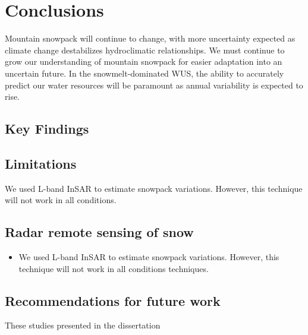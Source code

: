 
\hypertarget{ch5}{\chapter{Conclusions}\label{ch5}}

Mountain snowpack will continue to change, with more uncertainty expected as climate change destabilizes hydroclimatic relationships. We must continue to grow our understanding of mountain snowpack for easier adaptation into an uncertain future. In the snowmelt-dominated WUS, the ability to accurately predict our water resources will be paramount as annual variability is expected to rise.

\hypertarget{ch5-intro-1}{\section{Key Findings}\label{ch5-intro-1}}



\hypertarget{ch5-intro-1}{\section{Limitations}\label{ch5-intro-1}}

     \item We used L-band InSAR to estimate snowpack variations. However, this technique will not work in all conditions.

\hypertarget{ch5-intro-2}{\section{Radar remote sensing of snow}\label{ch5-intro-1}}
\begin{enumerate}
   \begin{itemize}
     \item We used L-band InSAR to estimate snowpack variations. However, this technique will not work in all conditions techniques.
   \end{itemize}
\end{enumerate}


\hypertarget{ch5-intro-1}{\section{Recommendations for future work}\label{ch5-intro-1}}
These studies presented in the dissertation 

